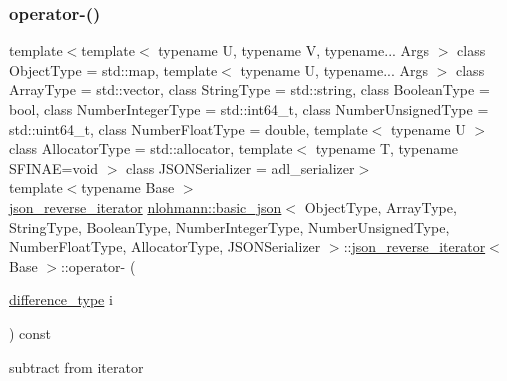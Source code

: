\subsubsection{\texorpdfstring{operator-\/()}{operator-()}\hspace{0.1cm}{\footnotesize\ttfamily [1/2]}}
{\footnotesize\ttfamily template$<$template$<$ typename U, typename V, typename... Args $>$ class Object\+Type = std\+::map, template$<$ typename U, typename... Args $>$ class Array\+Type = std\+::vector, class String\+Type  = std\+::string, class Boolean\+Type  = bool, class Number\+Integer\+Type  = std\+::int64\+\_\+t, class Number\+Unsigned\+Type  = std\+::uint64\+\_\+t, class Number\+Float\+Type  = double, template$<$ typename U $>$ class Allocator\+Type = std\+::allocator, template$<$ typename T, typename S\+F\+I\+N\+A\+E=void $>$ class J\+S\+O\+N\+Serializer = adl\+\_\+serializer$>$ \\
template$<$typename Base $>$ \\
\hyperlink{classnlohmann_1_1basic__json_1_1json__reverse__iterator}{json\+\_\+reverse\+\_\+iterator} \hyperlink{classnlohmann_1_1basic__json}{nlohmann\+::basic\+\_\+json}$<$ Object\+Type, Array\+Type, String\+Type, Boolean\+Type, Number\+Integer\+Type, Number\+Unsigned\+Type, Number\+Float\+Type, Allocator\+Type, J\+S\+O\+N\+Serializer $>$\+::\hyperlink{classnlohmann_1_1basic__json_1_1json__reverse__iterator}{json\+\_\+reverse\+\_\+iterator}$<$ Base $>$\+::operator-\/ (\begin{DoxyParamCaption}\item[{\hyperlink{classnlohmann_1_1basic__json_afe7c1303357e19cea9527af4e9a31d8f}{difference\+\_\+type}}]{i }\end{DoxyParamCaption}) const\hspace{0.3cm}{\ttfamily [inline]}}



subtract from iterator 

\mbox{\label{classnlohmann_1_1basic__json_1_1json__reverse__iterator_a344164ae696f1c5e672d1e7d3ac20fd9}} 
